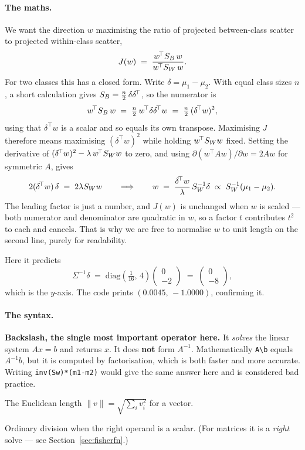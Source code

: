 \paragraph{The maths.} We want the direction $w$ maximising the ratio of
projected between-class scatter to projected within-class scatter,
\[
  J(w) \;=\; \frac{w^{\!\top}S_B\,w}{w^{\!\top}S_W\,w}.
\]
For two classes this has a closed form. Write $\delta = \mu_1 - \mu_2$. With
equal class sizes $n$, a short calculation gives
$S_B = \tfrac{n}{2}\,\delta\delta^{\!\top}$, so the numerator is
\[
  w^{\!\top}S_B\,w \;=\; \tfrac{n}{2}\,w^{\!\top}\delta\delta^{\!\top}w
  \;=\; \tfrac{n}{2}\,(\delta^{\!\top}w)^2 ,
\]
using that $\delta^{\!\top}w$ is a scalar and so equals its own transpose.
Maximising $J$ therefore means maximising $(\delta^{\!\top}w)^2$ while holding
$w^{\!\top}S_W w$ fixed. Setting the derivative of
$(\delta^{\!\top}w)^2 - \lambda\,w^{\!\top}S_W w$ to zero, and using
$\partial(w^{\!\top}Aw)/\partial w = 2Aw$ for symmetric $A$, gives
\[
  2(\delta^{\!\top}w)\,\delta \;=\; 2\lambda S_W w
  \qquad\Longrightarrow\qquad
  w \;=\; \frac{\delta^{\!\top}w}{\lambda}\,S_W^{-1}\delta
  \;\propto\; S_W^{-1}(\mu_1 - \mu_2).
\]
The leading factor is just a number, and $J(w)$ is unchanged when $w$ is
scaled --- both numerator and denominator are quadratic in $w$, so a factor
$t$ contributes $t^2$ to each and cancels. That is why we are free to
normalise $w$ to unit length on the second line, purely for readability.

Here it predicts
\[
  \Sigma^{-1}\delta \;=\; \mathrm{diag}\!\left(\tfrac{1}{16},\,4\right)
  \begin{pmatrix}0\\-2\end{pmatrix} \;=\; \begin{pmatrix}0\\-8\end{pmatrix},
\]
which is the $y$-axis. The code prints $(0.0045,\,-1.0000)$, confirming it.

\paragraph{The syntax.}
\begin{description}[leftmargin=*,style=nextline,nosep]
\item[\texttt{A \textbackslash\ b}] \textbf{Backslash, the single most
  important operator here.} It \emph{solves} the linear system $Ax = b$ and
  returns $x$. It does \textbf{not} form $A^{-1}$. Mathematically
  \texttt{A\textbackslash b} equals $A^{-1}b$, but it is computed by
  factorisation, which is both faster and more accurate. Writing
  \texttt{inv(Sw)*(m1-m2)} would give the same answer here and is considered
  bad practice.
\item[\texttt{norm(v)}] The Euclidean length $\|v\| = \sqrt{\sum_i v_i^2}$ for
  a vector.
\item[\texttt{/}] Ordinary division when the right operand is a scalar. (For
  matrices it is a \emph{right} solve --- see Section~\ref{sec:fisherfn}.)
\end{description}

